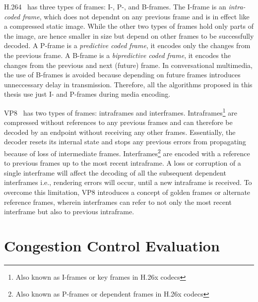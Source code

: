 H.264~\cite{h264} has three types of frames: I-, P-, and B-frames. The I-frame
is an \emph{intra-coded frame}, which does not dependnt on any previous frame
and is in effect like a compressed static image. While the other two types of
frames hold only parts of the image, are hence smaller in size but depend on
other frames to be successfully decoded. A P-frame is a \emph{predictive coded
frame}, it encodes only the changes from the previous frame. A B-frame is a
\emph{bipredictive coded frame}, it encodes the changes from the previous and
next (future) frame. In conversational multimedia, the use of B-frames is
avoided because depending on future frames introduces unneccessary delay in
transmission. Therefore, all the algorithms proposed in this thesis use just
I- and P-frames during media encoding.

VP8~\cite{rfc6386} has two types of frames: intraframes and interframes.
Intraframes\footnote{Also known as I-frames or key frames in H.26x codecs} are
compressed without references to any previous frames and can therefore be
decoded by an endpoint without receiving any other frames. Essentially, the
decoder resets its internal state and stops any previous errors from
propagating because of loss of intermediate frames. Interframes\footnote{Also
known as P-frames or dependent frames in H.26x codecs} are encoded with a
reference to previous frames up to the most recent intraframe. A loss or
corruption of a single interframe will affect the decoding of all the
subsequent dependent interframes i.e., rendering errors will occur, until a
new intraframe is received. To overcome this limitation, VP8 introduces a
concept of golden frames or alternate reference frames, wherein interframes
can refer to not only the most recent interframe but also to previous
intraframe.


\section{Congestion Control Evaluation}
\label{fw.cc.eval}


